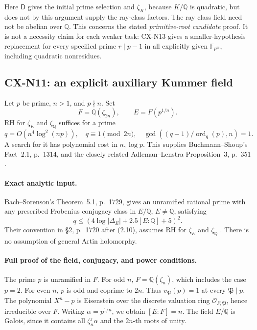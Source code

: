 Here \(\mathsf D\) gives the initial prime selection and \(\zeta_K\),
because \(K/\mathbb Q\) is quadratic, but does not by this argument
supply the ray-class factors. The ray class field need not be abelian
over \(\mathbb Q\). This concerns the stated \emph{primitive-root candidate}
proof. It is not a necessity claim for each weaker task:
CX-N13 gives a smaller-hypothesis replacement for every specified
prime \(r\mid p-1\) in all explicitly given \(\mathbb F_{p^m}\),
including quadratic nonresidues.

\subsection{CX-N11: an explicit auxiliary Kummer field}
\label{cx-n11}

Let \(p\) be prime, \(n>1\), and \(p\nmid n\). Set
\[
              F=\mathbb Q(\zeta_{2n}),\qquad E=F(p^{1/n}).
\]
RH for \(\zeta_E\) and \(\zeta_{\mathbb Q}\) suffices for a prime
\[
 q=O(n^4\log^2(np)),\quad q\equiv1\pmod{2n},\quad
 \gcd\!\left((q-1)/\operatorname{ord}_q(p),n\right)=1.             \tag{N11.1}
\]
A search for it has polynomial cost in \(n,\log p\).
This supplies Buchmann--Shoup's Fact~2.1, p.~1314, and the closely
related Adleman--Lenstra Proposition~3, p.~351
\cite{CXNBuchmannShoup96,CXNAdlemanLenstra86}.

\paragraph{Exact analytic input.}
Bach--Sorenson's Theorem~5.1, p.~1729, gives an unramified rational prime
with any prescribed Frobenius conjugacy class in \(E/\mathbb Q\),
\(E\ne\mathbb Q\), satisfying
\[
              q\leq(4\log|\Delta_E|+2.5[E:\mathbb Q]+5)^2.      \tag{N11.2}
\]
Their convention in \S2, p.~1720 after (2.10), assumes RH for
\(\zeta_E\) and \(\zeta_{\mathbb Q}\) \cite{CXNBachSorenson96}.
There is no assumption of general Artin holomorphy.

\paragraph{Full proof of the field, conjugacy, and power conditions.}
The prime \(p\) is unramified in \(F\).
For odd \(n\), \(F=\mathbb Q(\zeta_n)\), which includes the case \(p=2\).
For even \(n\), \(p\) is odd and coprime to \(2n\).
Thus \(v_{\mathfrak P}(p)=1\) at every \(\mathfrak P\mid p\).
The polynomial \(X^n-p\) is Eisenstein over the discrete valuation ring
\(\mathcal O_{F,\mathfrak P}\), hence irreducible over \(F\).
Writing \(\alpha=p^{1/n}\), we obtain \([E:F]=n\).
The field \(E/\mathbb Q\) is Galois, since it contains all
\(\zeta_n^j\alpha\) and the \(2n\)-th roots of unity.

